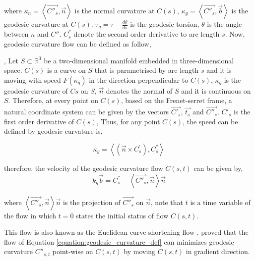 where $\kappa_n = \left \langle \vec{C''_{s}} , \vec{n} \right \rangle $ is the normal curvature at $C(s)$, $\kappa_{g} = \left \langle \vec{C''_{s}},\vec{b} \right \rangle$ is the geodesic curvature at $C(s)$.  $\tau_{g} = \tau - \frac{d\theta}{ds}$ is the geodesic torsion, $\theta$ is the angle between $n$ and $C''$.  $C^{''}_{s}$ denote the second order derivative to arc length $s$. Now, geodesic curvature flow can be defined as follow,
\begin{geodesic_def}
, Let $S \subset \mathbb{R}^{3}$ be a two-dimensional manifold embedded in three-dimensional space. $C(s)$ is a curve on $S$ that is parametrised by arc length $s$ and it is moving with speed $F(\kappa_{g})$ in the direction perpendicular to $C(s)$, $\kappa_{g}$ is the geodesic curvature of $C{s}$ on $S$, $\vec{n}$ denotes the normal of $S$ and it is continuous on $S$. Therefore, at every point on $C(s)$, based on the Frenet-serret frame, a natural coordinate system can be given by the vectors $\vec{C'_{s}}$, $\vec{t_{s}}$ and $\vec{C''_{s}}$. $C'_{s}$ is the first order derivative of $C(s)$, Thus, for any point $C(s)$, the speed can be defined by geodesic curvature is,


\begin{equation}
\kappa_{g} = \left \langle  (\vec{n} \times C^{'}_{s}), C^{''}_{s} \right \rangle
\end{equation}

therefore, the velocity of the geodesic curvature flow $C(s,t)$ can be given by,
\begin{equation}
k_{g}\vec{b} = C^{''}_{s}-\left \langle \vec{C''_{s}},\vec{n} \right \rangle\vec{n}
\label{equation:geodesic_curvature_def}
\end{equation}

where $\left \langle \vec{C''_{s}},\vec{n} \right \rangle\vec{n}$ is the projection of $\vec{C''_{s}}$ on $\vec{n}$, note that $t$ is a time variable of the flow in which $t = 0$ states the initial status of flow $C{(s,t)}$. 

\label{def:geodesic_cur_flow}
\end{geodesic_def}

This flow is also known as the Euclidean curve shortening flow .  proved that the flow of Equation \ref{equation:geodesic_curvature_def} can minimizes geodesic curvature $C''_{s,t}$ point-wise on $C(s,t)$ by moving $C(s,t)$ in gradient direction.

